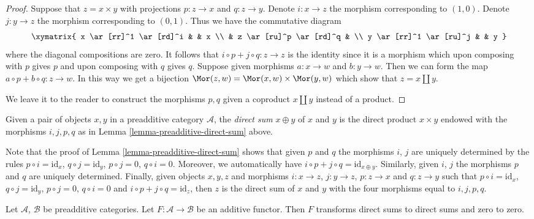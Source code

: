 \begin{proof}
Suppose that $z = x \times y$ with projections
$p : z \to x$ and $q : z \to y$. Denote $i : x \to z$
the morphism corresponding to $(1, 0)$. Denote $j : y \to z$
the morphism corresponding to $(0, 1)$. Thus we have the
commutative diagram
$$
\xymatrix{
x \ar[rr]^1 \ar[rd]^i & & x \\
& z \ar[ru]^p \ar[rd]^q & \\
y \ar[rr]^1 \ar[ru]^j & & y
}
$$
where the diagonal compositions are zero. It follows that
$i \circ p + j \circ q : z \to z$ is the identity since
it is a morphism which upon composing with $p$ gives $p$
and upon composing with $q$ gives $q$.
Suppose given morphisms $a : x \to w$ and $b : y \to w$.
Then we can form the map $a \circ p + b \circ q : z \to w$.
In this way we get a bijection $\Mor(z, w)
= \Mor(x, w) \times \Mor(y, w)$ which
show that $z = x \amalg y$.

\medskip\noindent
We leave it to the reader to construct the morphisms
$p, q$ given a coproduct $x \amalg y$ instead of a
product.
\end{proof}

\begin{definition}
\label{definition-direct-sum}
Given a pair of objects $x, y$ in a preadditive category $\mathcal{A}$,
the {\it direct sum} $x \oplus y$ of $x$ and $y$ is the direct
product $x \times y$ endowed with the morphisms
$i, j, p, q$ as in Lemma \ref{lemma-preadditive-direct-sum} above.
\end{definition}

\begin{remark}
\label{remark-direct-sum}
Note that the proof of Lemma \ref{lemma-preadditive-direct-sum}
shows that given $p$ and $q$ the morphisms $i$, $j$ are uniquely
determined by the rules $p \circ i = \text{id}_x$,
$q \circ j = \text{id}_y$, $p \circ j = 0$, $q \circ i = 0$.
Moreover, we automatically have
$i \circ p + j \circ q = \text{id}_{x \oplus y}$.
Similarly, given $i$, $j$ the morphisms $p$ and $q$ are uniquely determined.
Finally, given objects $x, y, z$ and morphisms
$i : x \to z$, $j : y \to z$, $p : z \to x$ and
$q : z \to y$ such that $p \circ i = \text{id}_x$,
$q \circ j = \text{id}_y$, $p \circ j = 0$, $q \circ i = 0$
and $i \circ p + j \circ q = \text{id}_z$, then $z$
is the direct sum of $x$ and $y$ with the four morphisms
equal to $i, j, p, q$.
\end{remark}

\begin{lemma}
\label{lemma-additive-additive}
Let $\mathcal{A}$, $\mathcal{B}$ be preadditive categories.
Let $F : \mathcal{A} \to \mathcal{B}$ be an additive functor.
Then $F$ transforms direct sums to direct sums and zero to zero.
\end{lemma}


